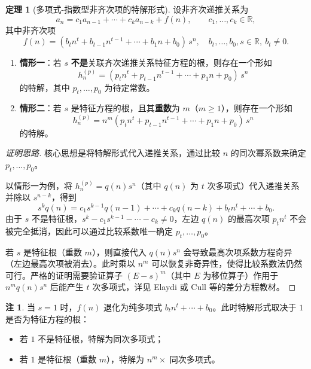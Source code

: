 \documentclass[UTF8,11pt,a4paper]{ctexbook}   %
\theoremstyle{definition}
\newtheorem{theorem}{定理}[section]
\newtheorem{remark}{注}[section]
\begin{document}
\begin{theorem}[多项式-指数型非齐次项的特解形式]\label{thm:undet-coeff}
设非齐次递推关系为
\[
a_n = c_1 a_{n-1} + \cdots + c_k a_{n-k} + f(n),
\qquad c_1,\dots,c_k\in\mathbb{R},
\]
其中非齐次项
\[
f(n) = (b_t n^t + b_{t-1} n^{t-1} + \cdots + b_1 n + b_0)\, s^n,
\quad b_t,\dots,b_0,s\in\mathbb{R},\ b_t\neq 0.
\]

\begin{enumerate}
    \item \textbf{情形一}：若 $s$ \textbf{不是}关联齐次递推关系特征方程的根，则存在一个形如
    \[
    h_n^{(p)} = (p_t n^t + p_{t-1} n^{t-1} + \cdots + p_1 n + p_0)\, s^n
    \]
    的特解，其中 $p_t,\dots,p_0$ 为待定常数。

    \item \textbf{情形二}：若 $s$ 是特征方程的根，且其\textbf{重数}为 $m$（$m\ge 1$），则存在一个形如
    \[
    h_n^{(p)} = n^m (p_t n^t + p_{t-1} n^{t-1} + \cdots + p_1 n + p_0)\, s^n
    \]
    的特解。
\end{enumerate}
\end{theorem}

\begin{proof}[证明思路]
核心思想是将特解形式代入递推关系，通过比较 $n$ 的同次幂系数来确定 $p_t,\dots,p_0$。

以情形一为例，将 $h_n^{(p)} = q(n)s^n$（其中 $q(n)$ 为 $t$ 次多项式）代入递推关系并除以 $s^{n-k}$，得到
\[
s^k q(n) = c_1 s^{k-1} q(n-1) + \cdots + c_k q(n-k) + b_t n^t + \cdots + b_0.
\]
由于 $s$ 不是特征根，$s^k - c_1 s^{k-1} - \cdots - c_k \neq 0$，左边 $q(n)$ 的最高次项 $p_t n^t$ 不会被完全抵消，因此可以通过比较系数唯一确定 $p_t,\dots,p_0$。

若 $s$ 是特征根（重数 $m$），则直接代入 $q(n)s^n$ 会导致最高次项系数方程奇异（左边最高次项被消去）。此时乘以 $n^m$ 可以恢复非奇异性，使得比较系数法仍然可行。严格的证明需要验证算子 $(E - s)^m$（其中 $E$ 为移位算子）作用于 $n^m q(n)s^n$ 后能产生 $t$ 次多项式，详见 Elaydi 或 Cull 等的差分方程教材。
\end{proof}

\begin{remark}
当 $s=1$ 时，$f(n)$ 退化为纯多项式 $b_t n^t + \cdots + b_0$。此时特解形式取决于 $1$ 是否为特征方程的根：
\begin{itemize}
    \item 若 $1$ 不是特征根，特解为同次多项式；
    \item 若 $1$ 是特征根（重数 $m$），特解为 $n^m \times$ 同次多项式。
\end{itemize}
\end{remark}
\end{document}
